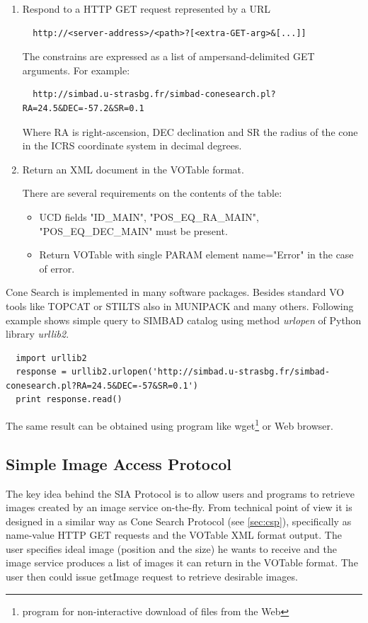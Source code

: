 \begin{enumerate}
\item Respond to a HTTP GET request represented by a URL 

\begin{lstlisting}
  http://<server-address>/<path>?[<extra-GET-arg>&[...]]
\end{lstlisting}

The constrains are expressed as a list of ampersand-delimited GET
arguments. For example:

\begin{lstlisting}
  http://simbad.u-strasbg.fr/simbad-conesearch.pl?RA=24.5&DEC=-57.2&SR=0.1
\end{lstlisting}

Where RA is right-ascension, DEC declination and SR the radius of the
cone in the ICRS coordinate system in decimal degrees. 

\item Return an XML document in the VOTable format.  

  There are several requirements on the contents of the table:

  \begin{itemize}
  \item UCD fields "ID\_MAIN", "POS\_EQ\_RA\_MAIN", "POS\_EQ\_DEC\_MAIN" must
    be present.
  \item Return VOTable with single PARAM element name="Error" in the
    case of error.
  \end{itemize}

\end{enumerate}

Cone Search is implemented in many software packages. Besides standard
VO tools like TOPCAT or STILTS also in MUNIPACK and many others.
Following example shows simple query to SIMBAD\cite{wenger2000simbad}
catalog using method \emph{urlopen} of Python library \emph{urllib2}.

\begin{lstlisting}
  import urllib2
  response = urllib2.urlopen('http://simbad.u-strasbg.fr/simbad-conesearch.pl?RA=24.5&DEC=-57&SR=0.1')
  print response.read()
\end{lstlisting}

\noindent The same result can be obtained using program like wget\footnote{program
  for non-interactive download of files from the Web} or Web browser.

\subsection{Simple Image Access Protocol}
The key idea behind the SIA Protocol is to allow users and programs to
retrieve images created by an image service on-the-fly. From technical
point of view it is designed in a similar way as Cone Search Protocol
(see \ref{sec:csp}), specifically as name-value HTTP GET requests and
the VOTable XML format output. The user specifies ideal image
(position and the size) he wants to receive and the image service
produces a list of images it can return in the VOTable format. The
user then could issue getImage request to retrieve desirable images.

